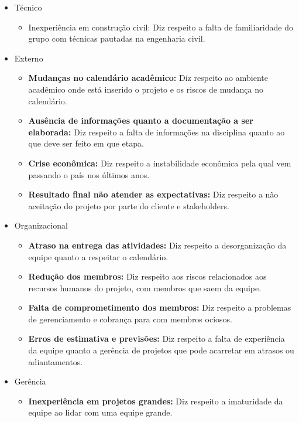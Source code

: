 \begin{itemize}
  \item Técnico
    \begin{itemize}

      \item Inexperiência em construção civil: Diz respeito a falta de familiaridade do grupo com técnicas pautadas na engenharia civil.
    \end{itemize}
  \item Externo
  \begin{itemize}
    \item \textbf{Mudanças no calendário acadêmico:} Diz respeito ao ambiente acadêmico onde está inserido o projeto e os riscos de mudança no calendário.
    \item \textbf{Ausência de informações quanto a documentação a ser elaborada:} Diz respeito a falta de informações na disciplina quanto ao que deve ser feito em que etapa.
    \item \textbf{Crise econômica:} Diz respeito a instabilidade econômica pela qual vem passando o país nos últimos anos.
    \item \textbf{Resultado final não atender as expectativas:} Diz respeito a não aceitação do projeto por parte do cliente e stakeholders.
  \end{itemize}


  \item Organizacional
  \begin{itemize}
    \item \textbf{Atraso na entrega das atividades:} Diz respeito a desorganização da equipe quanto a respeitar o calendário.
    \item \textbf{Redução dos membros:} Diz respeito aos riscos relacionados aos recursos humanos do projeto, com membros que saem da equipe.
    \item \textbf{Falta de comprometimento dos membros:} Diz respeito a problemas de gerenciamento e cobrança para com membros ociosos.
    \item \textbf{Erros de estimativa e previsões:} Diz respeito a falta de experiência da equipe quanto a gerência de projetos que pode acarretar em atrasos ou adiantamentos.
  \end{itemize}

  \item Gerência
  \begin{itemize}
    \item \textbf{Inexperiência em projetos grandes:} Diz respeito a imaturidade da equipe ao lidar com uma equipe grande.
  \end{itemize}

\end{itemize}

